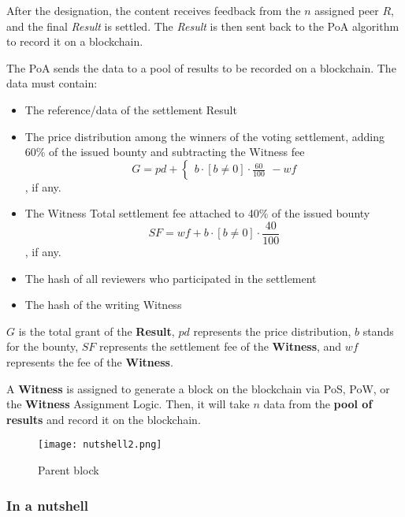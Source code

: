\documentclass{article}
\begin{document}
After the designation, the content receives feedback from the $n$ assigned peer $R$, and the final \textit{Result} is settled. The \textit{Result} is then sent back to the PoA algorithm to record it on a blockchain.

The PoA sends the data to a pool of results to be recorded on a blockchain. The data must contain:
\begin{itemize}
    \item The reference/data of the settlement Result
    \item The price distribution among the winners of the voting settlement, adding 60\% of the issued bounty and subtracting the Witness fee \[ G = pd + \begin{cases} b \cdot \left[ b \neq 0 \right] \cdot \frac{60}{100}
\end{cases} - wf\], if any.
    \item The Witness Total settlement fee attached to 40\% of the issued bounty \[SF = wf + b \cdot \left[ b \neq 0 \right] \cdot \frac{40}{100}
\], if any.
    \item The hash of all reviewers who participated in the settlement
    \item The hash of the writing Witness
\end{itemize}

\( G \) is the total grant of the \textbf{Result}, \( pd \) represents the price distribution, \( b \) stands for the bounty, \( SF \) represents the settlement fee of the \textbf{Witness}, and \( wf \) represents the fee of the \textbf{Witness}.

A \textbf{Witness} is assigned to generate a block on the blockchain via PoS, PoW, or the \textbf{Witness} Assignment Logic. Then, it will take \( n \) data from the \textbf{pool of results} and record it on the blockchain.

\begin{figure}[h]
\centering
\texttt{[image: nutshell2.png]}
\caption{Parent block}
\end{figure}

\subsubsection{In a nutshell}
\end{document}
